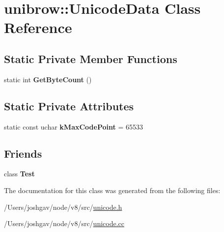 \hypertarget{classunibrow_1_1_unicode_data}{}\section{unibrow\+:\+:Unicode\+Data Class Reference}
\label{classunibrow_1_1_unicode_data}
\subsection*{Static Private Member Functions}
\begin{DoxyCompactItemize}
\item 
static int {\bfseries Get\+Byte\+Count} ()\hypertarget{classunibrow_1_1_unicode_data_a72c1f6378afc4f6b5649b60fd5c39d1b}{}\label{classunibrow_1_1_unicode_data_a72c1f6378afc4f6b5649b60fd5c39d1b}

\end{DoxyCompactItemize}
\subsection*{Static Private Attributes}
\begin{DoxyCompactItemize}
\item 
static const uchar {\bfseries k\+Max\+Code\+Point} = 65533\hypertarget{classunibrow_1_1_unicode_data_a2e8212ec5c576b3f34d0a6edca4b2eff}{}\label{classunibrow_1_1_unicode_data_a2e8212ec5c576b3f34d0a6edca4b2eff}

\end{DoxyCompactItemize}
\subsection*{Friends}
\begin{DoxyCompactItemize}
\item 
class {\bfseries Test}\hypertarget{classunibrow_1_1_unicode_data_a5b78b1c2e1fa07ffed92da365593eaa4}{}\label{classunibrow_1_1_unicode_data_a5b78b1c2e1fa07ffed92da365593eaa4}

\end{DoxyCompactItemize}


The documentation for this class was generated from the following files\+:\begin{DoxyCompactItemize}
\item 
/\+Users/joshgav/node/v8/src/\hyperlink{unicode_8h}{unicode.\+h}\item 
/\+Users/joshgav/node/v8/src/\hyperlink{unicode_8cc}{unicode.\+cc}\end{DoxyCompactItemize}
